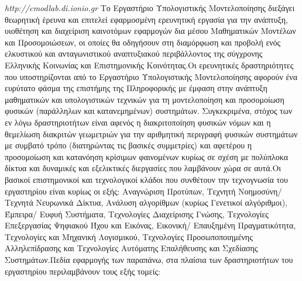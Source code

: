 \emph{http://cmodlab.di.ionio.gr} Το Εργαστήριο Υπολογιστικής
Μοντελοποίησης διεξάγει θεωρητική έρευνα και επιτελεί εφαρμοσμένη
ερευνητική εργασία για την ανάπτυξη, υιοθέτηση και διαχείριση καινοτόμων
εφαρμογών δια μέσου Μαθηματικών Μοντέλων και Προσομοιώσεων, οι οποίες θα
οδηγήσουν στη διαμόρφωση και προβολή ενός ελκυστικού και ανταγωνιστικού
αναπτυξιακού περιβάλλοντος της σύγχρονης Ελληνικής Κοινωνίας και
Επιστημονικής Κοινότητας.Οι ερευνητικές δραστηριότητες που
υποστηρίζονται από το Εργαστήριο Υπολογιστικής Μοντελοποίησης αφορούν
ένα ευρύτατο φάσμα της επιστήμης της Πληροφορικής με έμφαση στην
ανάπτυξη μαθηματικών και υπολογιστικών τεχνικών για τη μοντελοποίηση και
προσομοίωση φυσικών (παράλληλων και κατανεμημένων) συστημάτων.
Συγκεκριμένα, στόχος των εν λόγω δραστηριοτήτων είναι αφενός η
διακριτοποίηση φυσικών νόμων και η θεμελίωση διακριτών γεωμετριών για
την αριθμητική περιγραφή φυσικών συστημάτων με συμβατό τρόπο
(διατηρώντας τις βασικές συμμετρίες) και αφετέρου η προσομοίωση και
κατανόηση κρίσιμων φαινομένων κυρίως σε σχέση με πολύπλοκα δίκτυα και
δυναμικές και εξελικτικές διεργασίες που λαμβάνουν χώρα σε αυτά.Οι
βασικοί επιστημονικοί και τεχνολογικοί κλάδοι που συνθέτουν την
τεχνογνωσία του εργαστηρίου είναι κυρίως οι εξής: Αναγνώριση Προτύπων,
Τεχνητή Νοημοσύνη/ Τεχνητά Νευρωνικά Δίκτυα, Ανάλυση αλγορίθμων (κυρίως
Γενετικοί αλγόριθμοι), Έμπειρα/ Ευφυή Συστήματα, Τεχνολογίες Διαχείρισης
Γνώσης, Τεχνολογίες Επεξεργασίας Ψηφιακού Ήχου και Εικόνας, Εικονική/
Επαυξημένη Πραγματικότητα, Τεχνολογίες και Μηχανική Λογισμικού,
Τεχνολογίες Προσωποποιημένης Αλληλεπίδρασης και Τεχνολογίες Αυτόματης
Επαλήθευσης και Σχεδίασης Συστημάτων.Πεδία εφαρμογής των παραπάνω, στα
πλαίσια των δραστηριοτήτων του εργαστηρίου περιλαμβάνουν τους εξής
τομείς:

